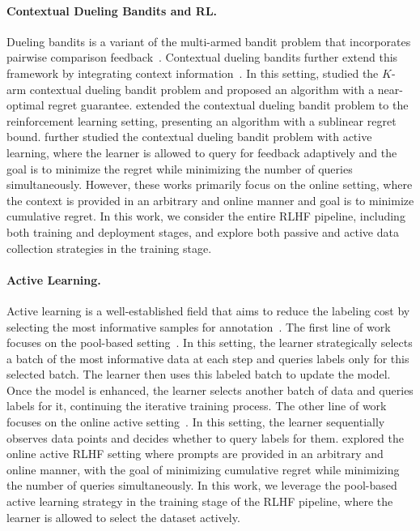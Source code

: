 \paragraph{Contextual Dueling Bandits and RL.} Dueling bandits is a variant of the multi-armed bandit problem that incorporates pairwise comparison feedback~\citep{JCSS'12:K-armed-dueling-bandits}. Contextual dueling bandits further extend this framework by integrating context information~\citep{COLT'15:Dudik-Contextual-dueling}. In this setting, \citet{NeurIPS'21:Saha-Preference-bandits} studied the $K$-arm contextual dueling bandit problem and proposed an algorithm with a near-optimal regret guarantee. \citet{AISTATS'23:Saha-Dueling-RL} extended the contextual dueling bandit problem to the reinforcement learning setting, presenting an algorithm with a sublinear regret bound. \citet{NeurIPS'24:Sekhari-Contextual-bandits} further studied the contextual dueling bandit problem with active learning, where the learner is allowed to query for feedback adaptively and the goal is to minimize the regret while minimizing the number of queries simultaneously. However, these works primarily focus on the online setting, where the context is provided in an arbitrary and online manner and goal is to minimize cumulative regret. In this work, we consider the entire RLHF pipeline, including both training and deployment stages, and explore both passive and active data collection strategies in the training stage.


\paragraph{Active Learning.} Active learning is a well-established field that aims to reduce the labeling cost by selecting the most informative samples for annotation~\citep{09:Settles-Active-learning}. The first line of work focuses on the pool-based setting~\citep{92:Query-by-committee, MLJ'97:active, NISP'10:Huang-active}. In this setting, the learner strategically selects a batch of the most informative data at each step and queries labels only for this selected batch. The learner then uses this labeled batch to update the model. Once the model is enhanced, the learner selects another batch of data and queries labels for it, continuing the iterative training process. The other line of work focuses on the online active setting~\citep{COLT'24:Bianchi-active,JMLR'06:Bianchi-selective}. In this setting, the learner sequentially observes data points and decides whether to query labels for them. \citet{arXiv'24:Ji-RLHF-active} explored the online active RLHF setting where prompts are provided in an arbitrary and online manner, with the goal of minimizing cumulative regret while minimizing the number of queries simultaneously. In this work, we leverage the pool-based active learning strategy in the training stage of the RLHF pipeline, where the learner is allowed to select the dataset actively.
